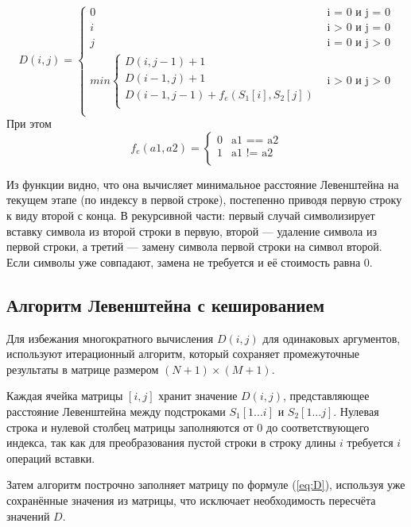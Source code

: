 \begin{equation}
	\label{eq:D}
	D(i, j) = 
	\begin{cases}
		0 &\text{i = 0 и j = 0}\\
		i &\text{i > 0 и j = 0}\\
		j &\text{i = 0 и j > 0}\\
		min \begin{cases}
			D(i, j - 1) + 1\\
			D(i - 1, j) + 1\\
			D(i - 1, j - 1) + f_e(S_1[i], S_2[j])\\
		\end{cases} &\text{i > 0 и j > 0}\\
	\end{cases}
\end{equation}
При этом
\begin{equation}
	\label{eq:f_e}
	f_e(a1, a2) = 
	\begin{cases}
		0 &\text{a1 == a2}\\
		1 &\text{a1 != a2}\\
	\end{cases}
\end{equation}

Из функции видно, что она вычисляет минимальное расстояние Левенштейна на текущем этапе (по индексу в первой строке), постепенно приводя первую строку к виду второй с конца. В рекурсивной части: первый случай символизирует вставку символа из второй строки в первую, второй — удаление символа из первой строки, а третий — замену символа первой строки на символ второй. Если символы уже совпадают, замена не требуется и её стоимость равна 0.\cite{algs}

\subsection{Алгоритм Левенштейна с кешированием}
Для избежания многократного вычисления $D(i, j)$ для одинаковых аргументов, используют итерационный алгоритм, который сохраняет промежуточные результаты в матрице размером $(N+1) \times (M+1)$.

Каждая ячейка матрицы $[i, j]$ хранит значение $D(i, j)$, представляющее расстояние Левенштейна между подстроками $S_1[1...i]$ и $S_2[1...j]$. Нулевая строка и нулевой столбец матрицы заполняются от 0 до соответствующего индекса, так как для преобразования пустой строки в строку длины $i$ требуется $i$ операций вставки.

Затем алгоритм построчно заполняет матрицу по формуле (\ref{eq:D}), используя уже сохранённые значения из матрицы, что исключает необходимость пересчёта значений $D$. 

